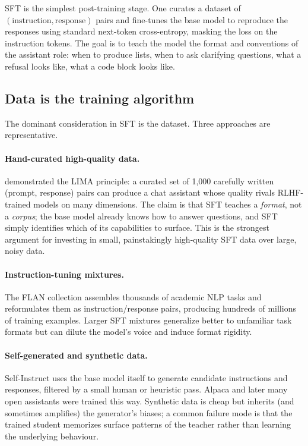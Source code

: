 SFT is the simplest post-training stage. One curates a dataset of
$(\text{instruction}, \text{response})$ pairs and fine-tunes the
base model to reproduce the responses using standard next-token
cross-entropy, masking the loss on the instruction tokens. The goal
is to teach the model the format and conventions of the assistant
role: when to produce lists, when to ask clarifying questions, what
a refusal looks like, what a code block looks like.

\subsection{Data is the training algorithm}

The dominant consideration in SFT is the dataset. Three approaches
are representative.

\paragraph{Hand-curated high-quality data.}
\citet{zhou2023lima} demonstrated the LIMA principle: a curated set
of 1,000 carefully written (prompt, response) pairs can produce a
chat assistant whose quality rivals RLHF-trained models on many
dimensions. The claim is that SFT teaches a \emph{format}, not a
\emph{corpus}; the base model already knows how to answer questions,
and SFT simply identifies which of its capabilities to surface. This
is the strongest argument for investing in small, painstakingly
high-quality SFT data over large, noisy data.

\paragraph{Instruction-tuning mixtures.} The FLAN collection
\citep{longpre2023flan} assembles thousands of academic NLP tasks
and reformulates them as instruction/response pairs, producing
hundreds of millions of training examples. Larger SFT mixtures
generalize better to unfamiliar task formats but can dilute the
model's voice and induce format rigidity.

\paragraph{Self-generated and synthetic data.} Self-Instruct
\citep{wang2023selfinstruct} uses the base model itself to generate
candidate instructions and responses, filtered by a small human or
heuristic pass. Alpaca and later many open assistants were trained
this way. Synthetic data is cheap but inherits (and sometimes
amplifies) the generator's biases; a common failure mode is that
the trained student memorizes surface patterns of the teacher
rather than learning the underlying behaviour.

